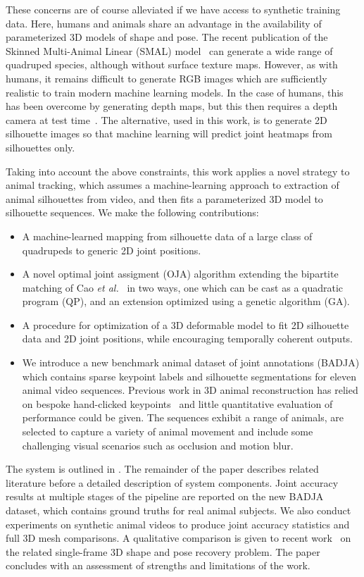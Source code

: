   These concerns are of course alleviated if we have access to synthetic training data.  Here, humans and animals share an advantage in the availability of parameterized 3D models of shape and pose.  The recent publication of the Skinned Multi-Animal Linear (SMAL) model~\cite{zuffi2017menagerie} can generate a wide range of quadruped species, although without surface texture maps.  However, as with humans, it remains difficult to generate RGB images which are sufficiently realistic to train modern machine learning models.  In the case of humans, this has been overcome by generating depth maps, but this then requires a depth camera at test time~\cite{shotton-kinect}. The alternative, used in this work, is to generate 2D silhouette images so that machine learning will predict joint heatmaps from silhouettes only.
  
  Taking into account the above constraints, this work applies a novel strategy to animal tracking, which assumes a machine-learning approach to extraction of animal silhouettes from video, and then fits a parameterized 3D model to silhouette sequences.  We make the following contributions:
  \begin{itemize}
  \item A machine-learned mapping from silhouette data of a large class of quadru\-peds to generic 2D joint positions.
  \item A novel optimal joint assigment (OJA) algorithm extending the bipartite matching of Cao {\em et al.}~\cite{cao2017realtime} in two ways, one which can be cast as a quadratic program (QP), and an extension optimized using a genetic algorithm (GA).
  \item A procedure for optimization of a 3D deformable model to fit 2D silhouette data and 2D joint positions, while encouraging temporally coherent outputs.
  \item We introduce a new benchmark animal dataset of joint annotations (BADJA) which contains sparse keypoint labels and silhouette segmentations for eleven animal video sequences. 
  Previous work in 3D animal reconstruction has relied on bespoke hand-clicked keypoints~\cite{zuffi2017menagerie,zuffi_lions} and little quantitative evaluation of performance could be given.
  The sequences exhibit a range of animals, are selected to capture a variety of animal movement and include some challenging visual scenarios such as occlusion and motion blur.
  \end{itemize}
  The system is outlined in .  The remainder of the paper describes related literature before a detailed description of system components.  Joint accuracy results at multiple stages of the pipeline are reported on the new BADJA dataset, which contains ground truths for real animal subjects. We also conduct experiments on synthetic animal videos to produce joint accuracy statistics and full 3D mesh comparisons. A qualitative comparison is given to recent work~\cite{zuffi2017menagerie} on the related single-frame 3D shape and pose recovery problem. The paper concludes with an assessment of strengths and limitations of the work.
  \newpage
